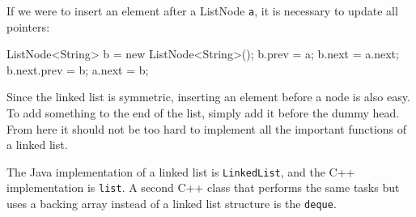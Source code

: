 If we were to insert an element after a ListNode \texttt{a}, it is necessary to update all pointers:

\begin{mylstlisting}
ListNode<String> b = new ListNode<String>();
b.prev = a;
b.next = a.next;
b.next.prev = b;
a.next = b;
\end{mylstlisting}

Since the linked list is symmetric, inserting an element before a node is also easy. To add something to the end of the list, simply add it before the dummy head. From here it should not be too hard to implement all the important functions of a linked list.

The Java implementation of a linked list is \texttt{LinkedList}, and the C++ implementation is \texttt{list}. A second C++ class that performs the same tasks but uses a backing array instead of a linked list structure is the \texttt{deque}.

